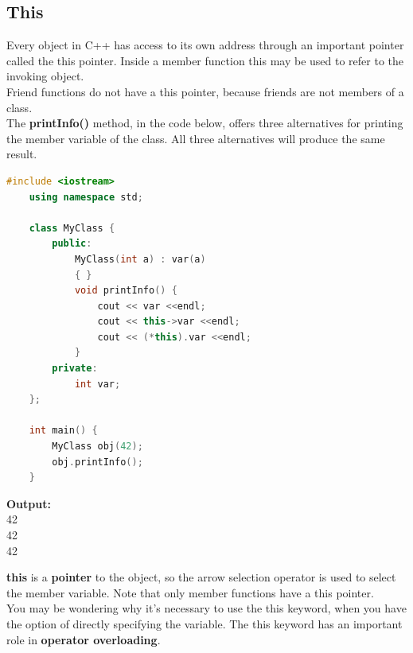 \documentclass[12pt , a4paper]{article}
\begin{document}
	\subsection{This}
Every object in C++ has access to its own address through an important pointer called the this pointer.
Inside a member function this may be used to refer to the invoking object.\\
Friend functions do not have a this pointer, because friends are not members of a class.\\
The \textbf{printInfo()} method, in the code below, offers three alternatives for printing the member variable of the class. All three alternatives will produce the same result.\\
	\begin{lstlisting}[language=C++]
	#include <iostream>
	using namespace std;
	
	class MyClass {
	    public:
	        MyClass(int a) : var(a)
	        { }
	        void printInfo() {
	            cout << var <<endl;
	            cout << this->var <<endl;
	            cout << (*this).var <<endl; 
	        }
	    private:
	        int var;
	};
	
	int main() {
	    MyClass obj(42);
	    obj.printInfo();
	}
	\end{lstlisting}
	\begin{tcolorbox}
	\textbf{Output:}\\
	42\\
	42\\
	42
	\end{tcolorbox}
\textbf{this} is a \textbf{pointer} to the object, so the arrow selection operator is used to select the member variable. Note that only member functions have a this pointer.\\
You may be wondering why it's necessary to use the this keyword, when you have the option of directly specifying the variable.
The this keyword has an important role in \textbf{operator overloading}.\\

\end{document}
